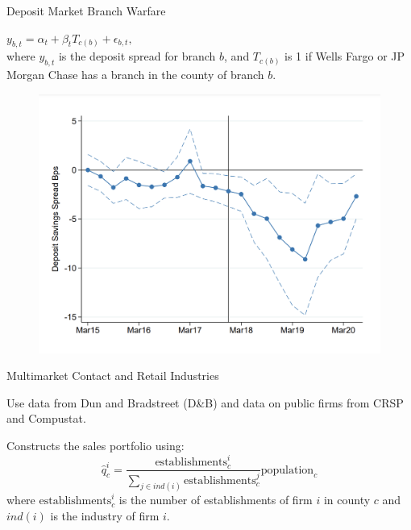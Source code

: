 \documentclass[notes,10.2pt, aspectratio=169]{beamer}
\newenvironment{wideitemize}{\itemize\addtolength{\itemsep}{10pt}}{\enditemize}
\begin{document}
\begin{frame}{Deposit Market Branch Warfare}

  \begin{wideitemize}
  \item $
  y_{b, t}=\alpha_t+\beta_t T_{c(b)}+\epsilon_{b, t},
  $\\
  where $y_{b, t}$ is the deposit spread for branch $b$, and $T_{c(b)}$ is 1 if Wells Fargo or JP Morgan Chase has a branch in the county of branch $b$.
\end{wideitemize}


\begin{figure}[t*]
  \centering
  \includegraphics[width=.55\textwidth]{./imgs/figure7.png}
\end{figure}

\end{frame}


\begin{frame}{Multimarket Contact and Retail Industries}

  \begin{wideitemize}
  \item Use data from Dun and Bradstreet (D\&B) and data on public firms from CRSP and Compustat.
  \item Constructs the sales portfolio using: 
  $$\hat{q}^i_c = \frac{\text{establishments}^i_c}{\sum_{j \in ind(i)} \text{establishments}^j_c}\text{population}_c$$
  where $\text{establishments}^i_c$ is the number of establishments of firm $i$ in county $c$ and $ind(i)$ is the industry of firm $i$.
\end{wideitemize}


\end{frame}
\end{document}
